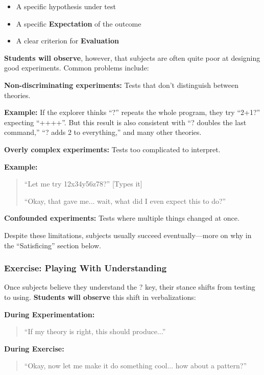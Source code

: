 \documentclass[12pt,letterpaper]{article}
\begin{document}
\begin{itemize}
\item A specific hypothesis under test
\item A specific \textbf{Expectation} of the outcome
\item A clear criterion for \textbf{Evaluation}
\end{itemize}

\textbf{Students will observe}, however, that subjects are often quite poor at designing good experiments. Common problems include:

\textbf{Non-discriminating experiments:} Tests that don't distinguish between theories.

\textbf{Example:} If the explorer thinks ``?'' repeats the whole program, they try ``2+1?'' expecting ``++++''. But this result is also consistent with ``? doubles the last command,'' ``? adds 2 to everything,'' and many other theories.

\textbf{Overly complex experiments:} Tests too complicated to interpret.

\textbf{Example:} 
\begin{quote}
``Let me try 12x34y56z78?'' [Types it]

``Okay, that gave me... wait, what did I even expect this to do?''
\end{quote}

\textbf{Confounded experiments:} Tests where multiple things changed at once.

Despite these limitations, subjects usually succeed eventually—more on why in the ``Satisficing'' section below.

\subsubsection{Exercise: Playing With Understanding}

Once subjects believe they understand the ? key, their stance shifts from testing to using. \textbf{Students will observe} this shift in verbalizations:

\textbf{During Experimentation:}
\begin{quote}
``If my theory is right, this should produce...''
\end{quote}

\textbf{During Exercise:}
\begin{quote}
``Okay, now let me make it do something cool... how about a pattern?''
\end{quote}
\end{document}
